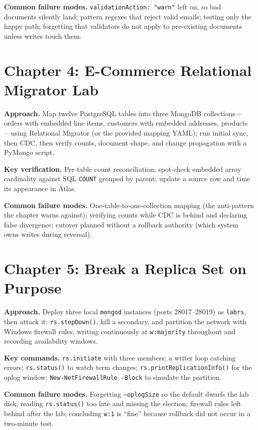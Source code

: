 \textbf{Common failure modes.} \texttt{validationAction: "warn"} left on, so bad documents
silently land; pattern regexes that reject valid emails; testing only the happy path; forgetting
that validators do not apply to pre-existing documents unless writes touch them.

\section{Chapter 4: E-Commerce Relational Migrator Lab}
\textbf{Approach.} Map twelve PostgreSQL tables into three MongoDB collections---orders with
embedded line items, customers with embedded addresses, products---using Relational Migrator (or
the provided mapping YAML); run initial sync, then CDC, then verify counts, document shape, and
change propagation with a PyMongo script.

\textbf{Key verification.} Per-table count reconciliation; spot-check embedded array cardinality
against SQL \texttt{COUNT} grouped by parent; update a source row and time its appearance in Atlas.

\textbf{Common failure modes.} One-table-to-one-collection mapping (the anti-pattern the chapter
warns against); verifying counts while CDC is behind and declaring false divergence; cutover
planned without a rollback authority (which system owns writes during reversal).

\section{Chapter 5: Break a Replica Set on Purpose}
\textbf{Approach.} Deploy three local \texttt{mongod} instances (ports 28017--28019) as
\texttt{labrs}, then attack it: \texttt{rs.stepDown()}, kill a secondary, and partition the
network with Windows firewall rules, writing continuously at \texttt{w:majority} throughout and
recording availability windows.

\textbf{Key commands.} \texttt{rs.initiate} with three members; a writer loop catching errors;
\texttt{rs.status()} to watch term changes; \texttt{rs.printReplicationInfo()} for the oplog
window; \texttt{New-NetFirewallRule -Block} to simulate the partition.

\textbf{Common failure modes.} Forgetting \texttt{--oplogSize} so the default dwarfs the lab
disk; reading \texttt{rs.status()} too late and missing the election; firewall rules left behind
after the lab; concluding \texttt{w:1} is ``fine'' because rollback did not occur in a two-minute
test.

